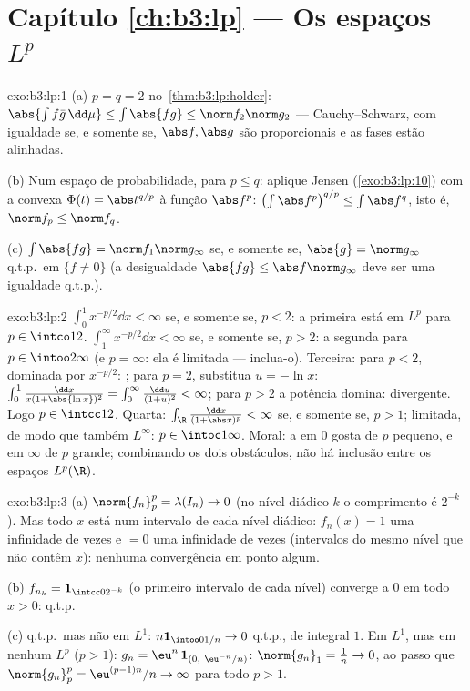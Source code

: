 \section*{Capítulo \ref{ch:b3:lp} --- Os espaços $L^p$}

\begin{solution}{exo:b3:lp:1}
(a) $p = q = 2$ no~\cref{thm:b3:lp:holder}: $\abs{\int f\bar
g\,\dd\mu} \leq \int\abs{fg} \leq \norm f_2\norm g_2$ ---
Cauchy--Schwarz, com igualdade se, e somente se, $\abs f, \abs g$ são
proporcionais e as fases estão alinhadas.

(b) Num espaço de probabilidade, para $p \leq q$: aplique Jensen
(\cref{exo:b3:lp:10}) com a convexa $\Phi(t) =
\abs t^{q/p}$ à função $\abs f^p$:
$\bigl(\int\abs f^p\bigr)^{q/p} \leq \int\abs f^q$, isto é,
$\norm f_p \leq \norm f_q$.

(c) $\int\abs{fg} = \norm f_1\norm g_\infty$ se, e somente se, $\abs{g} =
\norm g_\infty$ q.t.p.\ em $\{f \neq 0\}$ (a desigualdade
$\abs{fg} \leq \abs f\norm g_\infty$ deve ser uma igualdade
q.t.p.).
\end{solution}

\begin{solution}{exo:b3:lp:2}
$\int_0^1 x^{-p/2}\dd x < \infty$ se, e somente se, $p < 2$: a primeira está em
$L^p$ para $p \in \intco12$. $\int_1^\infty x^{-p/2}\dd x <
\infty$ se, e somente se, $p > 2$: a segunda para $p \in \intoo2\infty$ (e
$p = \infty$: ela é limitada --- inclua-o). Terceira: para $p <
2$, dominada por $x^{-p/2}$: ; para $p = 2$,
substitua $u = -\ln x$: $\int_0^1\frac{\dd x}{x(1 + \abs{\ln
x})^2} = \int_0^\infty\frac{\dd u}{(1 + u)^2} < \infty$; para
$p > 2$ a potência domina: divergente. Logo $p \in \intcc12$.
Quarta: $\int_\R\frac{\dd x}{(1 + \abs x)^p} < \infty$ se, e somente se, $p >
1$; limitada, de modo que também $L^\infty$: $p \in
\intoc1\infty$. Moral: a  em $0$ gosta de $p$ pequeno, e em
$\infty$ de $p$ grande; combinando os dois obstáculos, não há inclusão
entre os espaços $L^p(\R)$.
\end{solution}

\begin{solution}{exo:b3:lp:3}
(a) $\norm{f_n}_p^p = \lambda(I_n) \to 0$ (no nível diádico $k$
o comprimento é $2^{-k}$). Mas todo $x$ está num intervalo de
cada nível diádico: $f_n(x) = 1$ uma infinidade de vezes e $= 0$
uma infinidade de vezes (intervalos do mesmo nível que não contêm
$x$): nenhuma convergência em ponto algum.

(b) $f_{n_k} = \mathbf 1_{\intcc0{2^{-k}}}$ (o primeiro intervalo
de cada nível) converge a $0$ em todo $x > 0$: q.t.p.

(c) q.t.p.\ mas não em $L^1$: $n\mathbf 1_{\intoo0{1/n}} \to 0$
q.t.p., de integral $1$. Em $L^1$, mas em nenhum $L^p$ ($p > 1$): $g_n =
\eu^n\,\mathbf 1_{(0,\ \eu^{-n}/n)}$: $\norm{g_n}_1 = \frac1n
\to 0$, ao passo que $\norm{g_n}_p^p = \eu^{(p-1)n}/n \to \infty$ para
todo $p > 1$.
\end{solution}

